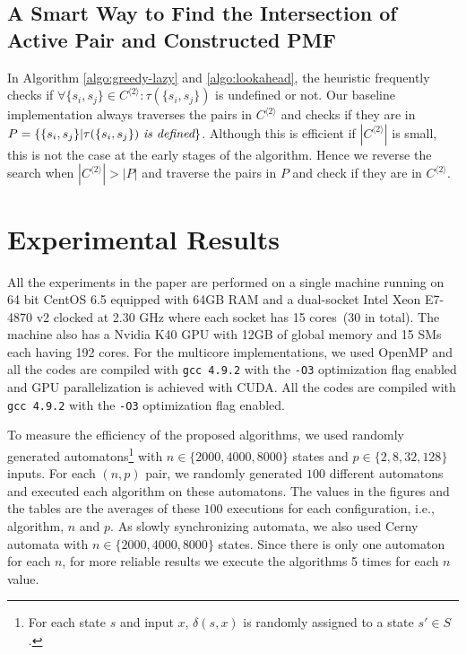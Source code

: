 \documentclass[12pt]{article}
\begin{document}
\subsection{A Smart Way to Find the Intersection of Active Pair and Constructed PMF}
\label{sec:smart}

In Algorithm \ref{algo:greedy-lazy} and \ref{algo:lookahead}, the heuristic frequently checks if $\forall \{ s_i,s_j \} \in C^{\langle 2 \rangle}: \tau(\{ s_i,s_j \})$ is undefined or not. Our baseline implementation always traverses the pairs in $C^{\langle 2 \rangle}$ and checks if they are in $P = \{ \{s_i, s_j \} | \tau(\{s_i, s_j \})~ \mbox{\em is defined} \}$. Although this is efficient if $|C^{\langle 2 \rangle}|$ is small, this is not the case at the early stages of the algorithm. Hence we reverse the search when $|C^{\langle 2 \rangle}| > |P|$ and traverse the pairs in $P$ and check if they are in $C^{\langle 2 \rangle}$.





\clearpage
\section{Experimental Results}
\label{sec:results}

All the experiments in the paper are performed on a single machine running on 64 bit CentOS 6.5 equipped with 64GB RAM and a dual-socket Intel Xeon E7-4870 v2 clocked at 2.30 GHz where each socket  has 15 cores~(30 in total). The machine also has a Nvidia K40 GPU with 12GB of global memory and 15 SMs each having 192 cores. For the multicore implementations, we used OpenMP and all the codes are compiled with {\tt gcc 4.9.2} with the {\tt -O3} optimization flag enabled and GPU parallelization is achieved with CUDA. All the codes are compiled with {\tt gcc 4.9.2} with the {\tt -O3} optimization flag enabled.

\sloppy
To measure the efficiency of the proposed algorithms, we used randomly generated automatons\footnote{For each state $s$ and input $x$, $\delta(s,x)$ is randomly assigned to a state $s' \in S$.} with $n  \in \{2000, 4000, 8000\}$ states and ${p \in \{2, 8, 32, 128\}}$ inputs. For each $(n, p)$ pair, we randomly generated $100$ different automatons and executed each algorithm on these automatons. The values in the figures and the tables are the averages of these $100$ executions for each configuration, i.e., algorithm, $n$ and $p$. As slowly synchronizing automata, we also used Cerny automata with $n  \in \{2000, 4000, 8000\}$ states. Since there is only one automaton for each $n$, for more reliable results we execute the algorithms 5 times for each $n$ value.
\end{document}
